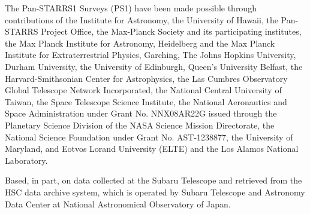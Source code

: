 The Pan-STARRS1 Surveys (PS1) have been made possible through contributions of the Institute for Astronomy, the University of Hawaii, the Pan-STARRS Project Office, the Max-Planck Society and its participating institutes, the Max Planck Institute for Astronomy, Heidelberg and the Max Planck Institute for Extraterrestrial Physics, Garching, The Johns Hopkins University, Durham University, the University of Edinburgh, Queen’s University Belfast, the Harvard-Smithsonian Center for Astrophysics, the Las Cumbres Observatory Global Telescope Network Incorporated, the National Central University of Taiwan, the Space Telescope Science Institute, the National Aeronautics and Space Administration under Grant No. NNX08AR22G issued through the Planetary Science Division of the NASA Science Mission Directorate, the National Science Foundation under Grant No. AST-1238877, the University of Maryland, and Eotvos Lorand University (ELTE) and the Los Alamos National Laboratory.


Based, in part, on data collected at the Subaru Telescope and retrieved from the HSC data archive system, which is operated by Subaru Telescope and Astronomy Data Center at National Astronomical Observatory of Japan.




